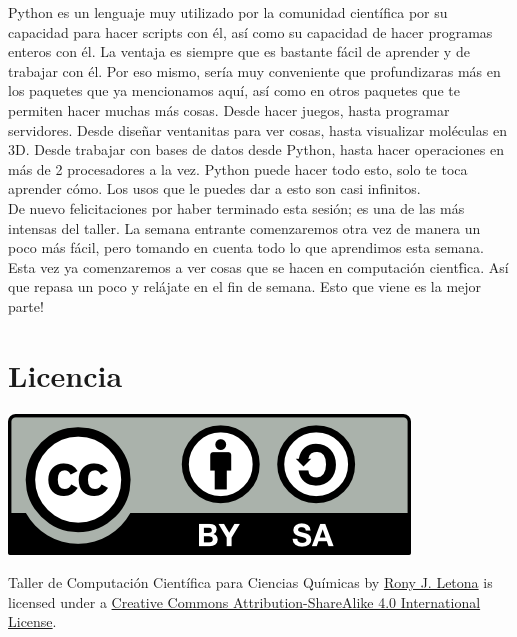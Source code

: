 \documentclass[10pt,letterpaper]{article}
\begin{document}
Python es un lenguaje muy utilizado por la comunidad cient\'ifica por su capacidad para hacer scripts con \'el, as\'i como su capacidad de hacer programas enteros con \'el. La ventaja es siempre que es bastante f\'acil de aprender y de trabajar con \'el. Por eso mismo, ser\'ia muy conveniente que profundizaras m\'as en los paquetes que ya mencionamos aqu\'i, as\'i como en otros paquetes que te permiten hacer muchas m\'as cosas. Desde hacer juegos, hasta programar servidores. Desde dise\~nar ventanitas para ver cosas, hasta visualizar mol\'eculas en 3D. Desde trabajar con bases de datos desde Python, hasta hacer operaciones en m\'as de 2 procesadores a la vez. Python puede hacer todo esto, solo te toca aprender c\'omo. Los usos que le puedes dar a esto son casi infinitos.\\

De nuevo felicitaciones por haber terminado esta sesi\'on; es una de las m\'as intensas del taller. La semana entrante comenzaremos otra vez de manera un poco m\'as f\'acil, pero tomando en cuenta todo lo que aprendimos esta semana. Esta vez ya comenzaremos a ver cosas que se hacen en computaci\'on cient\'fica. As\'i que repasa un poco y rel\'ajate en el fin de semana. Esto que viene es la mejor parte!

\section*{Licencia}

\noindent \includegraphics{img/cc_big.png}

\noindent Taller de Computaci\'on Cient\'ifica para Ciencias Qu\'imicas by \href{http://github.com/zronyj/TC3Q}{Rony J. Letona} is licensed under a \href{http://creativecommons.org/licenses/by-sa/4.0/}{Creative Commons Attribution-ShareAlike 4.0 International License}.
\end{document}

